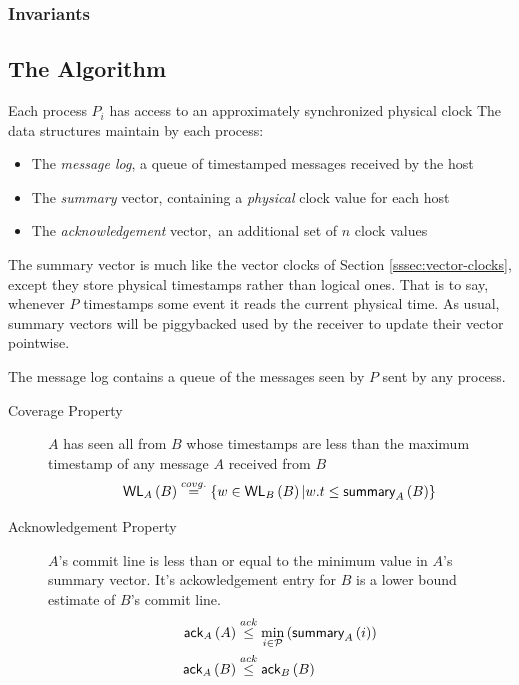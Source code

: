 \documentclass[]             %
{NASA}                       %
\theoremstyle{definition}
\begin{document}
\subsubsection{Invariants}

\subsection{The Algorithm}

Each process $P_i$ has access to an approximately synchronized physical clock
The data structures maintain by each process:

\begin{itemize}
\item The \emph{message log}, a queue of timestamped messages received by the host
\item The \emph{summary} vector, containing a \emph{physical} clock value for each host
\item The \emph{acknowledgement} vector,\ an additional set of $n$ clock values
\end{itemize}

The summary vector is much like the vector clocks of Section
\ref{sssec:vector-clocks}, except they store physical timestamps
rather than logical ones. That is to say, whenever $P$ timestamps some
event it reads the current physical time. As usual, summary vectors
will be piggybacked used by the receiver to update their vector
pointwise.

The message log contains a queue of the messages seen by $P$ sent by
any process.



\begin{description}
\item[Coverage Property] $A$ has seen all from $B$ whose timestamps are less
  than the maximum timestamp of any message $A$ received from $B$
  \[ \textsf{WL}_{A}\left(B\right) \overset{covg.}{=} \{w \in \textsf{WL}_{B}\left(B\right) | w.t \leq \textsf{summary}_{A}\left(B\right) \} \]
\item[Acknowledgement Property] $A$'s commit line is less than or equal to the minimum value in $A$'s summary vector. It's ackowledgement entry for $B$ is a lower bound estimate of $B$'s commit line.
  \begin{align*}
    \textsf{ack}_{A}\left(A\right) &\overset{ack}{\leq} \min_{i \in \mathcal{P}} \left(\textsf{summary}_{A}\left(i\right)\right) \\
    \textsf{ack}_{A}\left(B\right) &\overset{ack}{\leq} \textsf{ack}_{B}\left(B\right)
  \end{align*}
\end{description}
\end{document}

